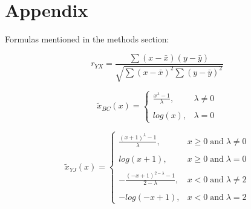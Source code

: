 \documentclass{article}
\begin{document}
\printbibliography %

\appendix
\section{Appendix}
Formulas mentioned in the methods section:

\begin{equation}\label{pearsonr}
    r_{YX} = \frac{\sum (x-\bar{x})(y-\bar{y})}{\sqrt{\sum (x-\bar{x})^2 \sum (y-\bar{y})^2}}
\end{equation}

\vspace{5mm} %

\begin{equation}\label{boxcox}
         \widetilde{x}_{BC}(x)=\left\{\begin{array}{ll} \frac{x^\lambda - 1}{\lambda}, & \lambda \neq 0 \\ \\
         log(x), & \lambda = 0\end{array}\right.
\end{equation}

\vspace{5mm} %

\begin{equation}\label{yeojohnson}
         \widetilde{x}_{YJ}(x)=\left\{\begin{array}{ll} \frac{(x+1)^\lambda -1}{\lambda}, & x \geq 0 \; \textrm{and} \;  \lambda \neq 0 \\ \\
         log(x+1), & x \geq 0 \; \textrm{and} \; \lambda = 0 \\ \\
         -\frac{(-x+1)^{2-\lambda}-1}{2-\lambda}, & x < 0 \; \textrm{and} \; \lambda \neq 2 \\ \\
         -log(-x+1), & x < 0 \; \textrm{and} \; \lambda = 2\end{array} \right.
\end{equation}
\end{document}
